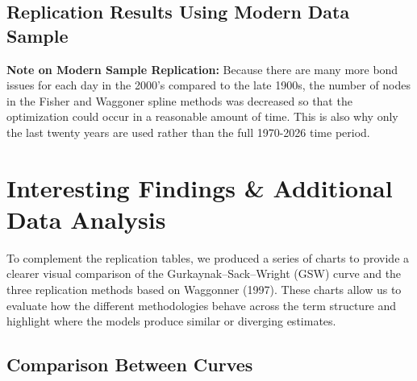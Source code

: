 \documentclass{article}
\begin{document}
\subsection{Replication Results Using Modern Data Sample}

\begin{table}[htbp]
\centering

\caption{Model fitting performance using the modern Treasury sample (last 20 years). The table reports in-sample WMAE and hit rates for each spline method across maturity buckets using more recent Treasury data. The key takeaway is that the relative ranking of methods remains similar to the historical replication, indicating that the spline approaches behave consistently even when applied to a much denser modern bond market.}
\label{tab:2a}
\end{table}

\begin{table}[htbp]
\centering

\caption{Out-of-sample performance of spline models using the modern Treasury sample (past 20 years). The table shows pricing errors and hit rates across maturity buckets. The main takeaway is that model fit generally deteriorates slightly at longer maturities and out-of-sample, highlighting where spline methods struggle most when predicting bond prices.}
\label{tab:2b}
\end{table}

\textbf{Note on Modern Sample Replication:} Because there are many more bond issues for each day in the 2000's compared to the late 1900s, the number of nodes in the Fisher and Waggoner spline methods was decreased so that the optimization could occur in a reasonable amount of time. This is also why only the last twenty years are used rather than the full 1970-2026 time period.

\section{Interesting Findings \& Additional Data Analysis}

To complement the replication tables, we produced a series of charts to provide a clearer visual comparison of the Gurkaynak–Sack–Wright (GSW) curve and the three replication methods based on Waggonner (1997). These charts allow us to evaluate how the different methodologies behave across the term structure and highlight where the models produce similar or diverging estimates. 

\subsection{Comparison Between Curves}
\end{document}

